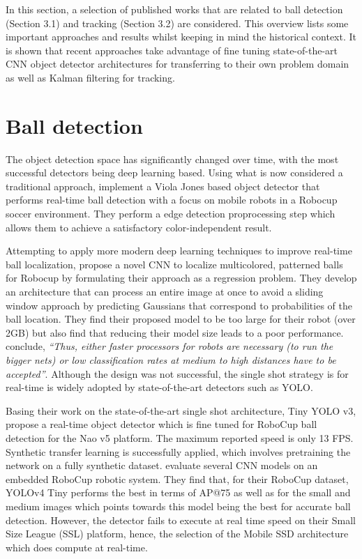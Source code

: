 \documentclass[a4paper,twoside,12pt]{report}
\begin{document}
In this section, a selection of published works that are related to ball detection  (Section 3.1) and tracking (Section 3.2) are considered. This overview lists some important approaches and results whilst keeping in mind the historical context. It is shown that recent approaches take advantage of fine tuning state-of-the-art CNN object detector architectures for transferring to their own problem domain as well as Kalman filtering for tracking.

\section{Ball detection}

The object detection space has significantly changed over time, with the most successful detectors being deep learning based. Using what is now considered a traditional approach, \cite{robovj} implement a Viola Jones based object detector that performs real-time ball detection with a focus on mobile robots in a Robocup soccer environment. They perform a edge detection proprocessing step which allows them to achieve a satisfactory color-independent result.

Attempting to apply more modern deep learning techniques to improve real-time ball localization, \cite{selfcnn} propose a novel CNN to localize multicolored, patterned balls for Robocup by formulating their approach as a regression problem. They develop an architecture that can process an entire image at once to avoid a sliding window approach by predicting Gaussians that correspond to probabilities of the ball location. They find their proposed model to be too large for their robot (over 2GB) but also find that reducing their model size leads to a poor performance. \cite{selfcnn} conclude, \textit{``Thus, either faster processors for robots are necessary (to run the bigger nets) or low classification rates at medium to high distances have to be accepted''}. Although the design was not successful, the single shot strategy is for real-time is widely adopted by state-of-the-art detectors such as YOLO.

Basing their work on the state-of-the-art single shot architecture, Tiny YOLO v3, \cite{robo} propose a real-time object detector which is fine tuned for RoboCup ball detection for the Nao v5 platform. The maximum reported speed is only 13 FPS. Synthetic transfer learning is successfully applied, which involves pretraining the network on a fully synthetic dataset. \cite{robocupdataset} evaluate several CNN models on an embedded RoboCup robotic system. They find that, for their RoboCup dataset, YOLOv4 Tiny performs the best in terms of AP@75 as well as for the small and medium images which points towards this model being the best for accurate ball detection. However, the detector fails to execute at real time speed on their Small Size League (SSL) platform, hence, the selection of the Mobile SSD architecture which does compute at real-time.
\end{document}
